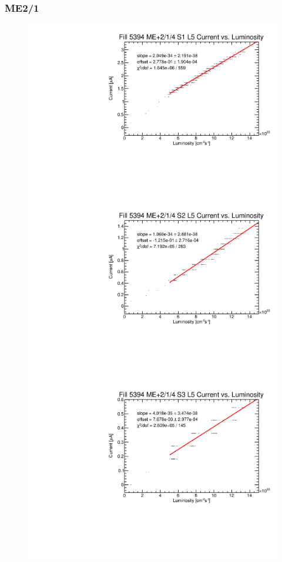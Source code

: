 \subsubsection{ME2/1}
\begin{figure}
    \centering
    \includegraphics[width=0.7\twoThirdsFigWidth]{figures/neutron/ME21_P_04_1_5_f5394_curr_lumi.pdf}
    \includegraphics[width=0.7\twoThirdsFigWidth]{figures/neutron/ME21_P_04_2_5_f5394_curr_lumi.pdf}
    \includegraphics[width=0.7\twoThirdsFigWidth]{figures/neutron/ME21_P_04_3_5_f5394_curr_lumi.pdf}

\end{figure}
